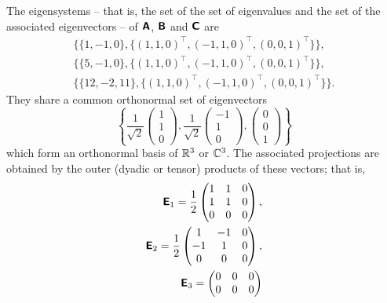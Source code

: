 {The eigensystems -- that is, the set of the set of eigenvalues and the set of the associated eigenvectors -- of $\textsf{\textbf{A}}$,
$\textsf{\textbf{B}}$
and
$\textsf{\textbf{C}}$
are
\begin{equation}
\begin{split}
\{\{1,-1,  0\}, \{(1, 1, 0)^\intercal , (-1, 1, 0)^\intercal , (0, 0, 1)^\intercal \}\} ,\\
\{\{5, -1, 0\},  \{(1, 1, 0)^\intercal , (-1, 1, 0)^\intercal , (0, 0, 1)^\intercal \}\},\\
\{\{12, -2, 11\},  \{(1, 1, 0)^\intercal , (-1, 1, 0)^\intercal , (0, 0, 1)^\intercal \}\}.
\end{split}
\end{equation}
They share a common orthonormal set of eigenvectors
$$
\left\{
\frac{1}{\sqrt{2}}
\begin{pmatrix}
1\\ 1\\ 0
\end{pmatrix},
\frac{1}{\sqrt{2}}
\begin{pmatrix}
-1\\ 1\\ 0
\end{pmatrix},
\begin{pmatrix}
0\\ 0\\ 1\end{pmatrix}
\right\}
$$
which form an orthonormal basis of ${\Bbb R}^3$ or ${\Bbb C}^3$.
The associated projections are obtained by the outer (dyadic or tensor) products
of these vectors; that is,
\begin{equation}
\begin{split}
\textsf{\textbf{E}}_1= \frac{1}{2}
\begin{pmatrix}
1& 1& 0\\
1& 1& 0\\
0& 0& 0
\end{pmatrix},\\
\textsf{\textbf{E}}_2= \frac{1}{2}
\begin{pmatrix}
1& -1& 0\\
-1& 1& 0\\
0& 0& 0
\end{pmatrix},\\
\textsf{\textbf{E}}_3=
\begin{pmatrix}
0& 0& 0\\
0& 0& 0\\

\end{pmatrix}
\end{split}
\end{equation}}

